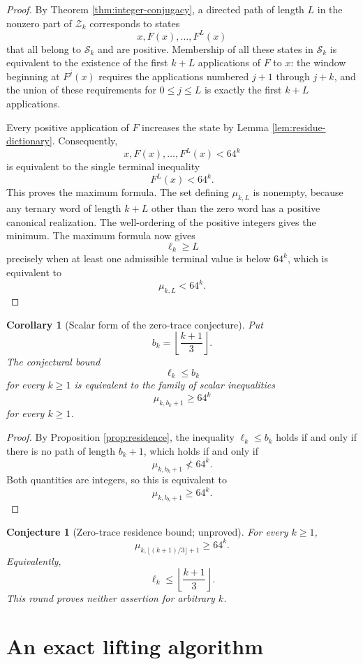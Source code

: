 \documentclass[11pt]{article}
\newtheorem{corollary}[theorem]{Corollary}
\newtheorem{conjecture}[theorem]{Conjecture}
\theoremstyle{definition}
\theoremstyle{remark}
\begin{document}
\begin{proof}
By Theorem \ref{thm:integer-conjugacy}, a directed path of length $L$ in the nonzero part of $\mathcal Z_k$ corresponds to states
\[
x,F(x),\ldots,F^L(x)
\]
that all belong to $\mathcal S_k$ and are positive. Membership of all these states in $\mathcal S_k$ is equivalent to the existence of the first $k+L$ applications of $F$ to $x$: the window beginning at $F^j(x)$ requires the applications numbered $j+1$ through $j+k$, and the union of these requirements for $0\le j\le L$ is exactly the first $k+L$ applications.

Every positive application of $F$ increases the state by Lemma \ref{lem:residue-dictionary}. Consequently,
\[
x,F(x),\ldots,F^L(x)<64^k
\]
is equivalent to the single terminal inequality
\[
F^L(x)<64^k.
\]
This proves the maximum formula. The set defining $\mu_{k,L}$ is nonempty, because any ternary word of length $k+L$ other than the zero word has a positive canonical realization. The well-ordering of the positive integers gives the minimum. The maximum formula now gives
\[
\ell_k\ge L
\]
precisely when at least one admissible terminal value is below $64^k$, which is equivalent to
\[
\mu_{k,L}<64^k.
\]
\end{proof}

\begin{corollary}[Scalar form of the zero-trace conjecture]
\label{cor:scalar-ZT}
Put
\[
b_k=\left\lfloor\frac{k+1}{3}\right\rfloor.
\]
The conjectural bound
\[
\ell_k\le b_k
\]
for every $k\ge1$ is equivalent to the family of scalar inequalities
\[
\mu_{k,b_k+1}\ge64^k
\]
for every $k\ge1$.
\end{corollary}

\begin{proof}
By Proposition \ref{prop:residence}, the inequality $\ell_k\le b_k$ holds if and only if there is no path of length $b_k+1$, which holds if and only if
\[
\mu_{k,b_k+1}\not<64^k.
\]
Both quantities are integers, so this is equivalent to
\[
\mu_{k,b_k+1}\ge64^k.
\]
\end{proof}

\begin{conjecture}[Zero-trace residence bound; unproved]
\label{conj:ZT}
For every $k\ge1$,
\[
\mu_{k,\lfloor(k+1)/3\rfloor+1}\ge64^k.
\]
Equivalently,
\[
\ell_k\le\left\lfloor\frac{k+1}{3}\right\rfloor.
\]
This round proves neither assertion for arbitrary $k$.
\end{conjecture}

\section{An exact lifting algorithm}
\end{document}

